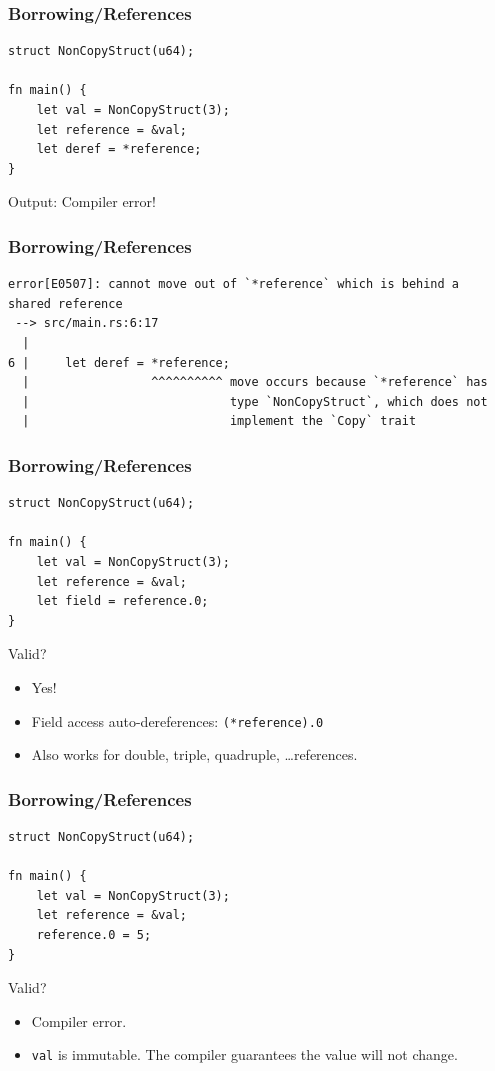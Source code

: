 \begin{frame}[fragile]
    \frametitle{Borrowing/References}
    \begin{verbatim}
struct NonCopyStruct(u64);

fn main() {
    let val = NonCopyStruct(3);
    let reference = &val;
    let deref = *reference;
}
    \end{verbatim}
    \pause
    \vfill
    Output:
    \pause
    Compiler error!
\end{frame}

\begin{frame}[fragile]
    \frametitle{Borrowing/References}
    \begin{verbatim}
error[E0507]: cannot move out of `*reference` which is behind a
shared reference
 --> src/main.rs:6:17
  |
6 |     let deref = *reference;
  |                 ^^^^^^^^^^ move occurs because `*reference` has
  |                            type `NonCopyStruct`, which does not
  |                            implement the `Copy` trait
    \end{verbatim}
\end{frame}

\begin{frame}[fragile]
    \frametitle{Borrowing/References}
    \begin{verbatim}
struct NonCopyStruct(u64);

fn main() {
    let val = NonCopyStruct(3);
    let reference = &val;
    let field = reference.0;
}
    \end{verbatim}
    \pause
    \vfill
    Valid?
    \pause
    \vfill
    \begin{itemize}
        \item Yes!
        \pause
        \item Field access auto-dereferences: \texttt{(*reference).0}
        \item Also works for double, triple, quadruple, \ldots references.
    \end{itemize}
\end{frame}

\begin{frame}[fragile]
    \frametitle{Borrowing/References}
    \begin{verbatim}
struct NonCopyStruct(u64);

fn main() {
    let val = NonCopyStruct(3);
    let reference = &val;
    reference.0 = 5;
}
    \end{verbatim}
    \pause
    \vfill
    Valid?
    \pause
    \vfill
    \begin{itemize}
        \item Compiler error.
        \item \texttt{val} is immutable. The compiler guarantees the value will not change.
    \end{itemize}
\end{frame}

